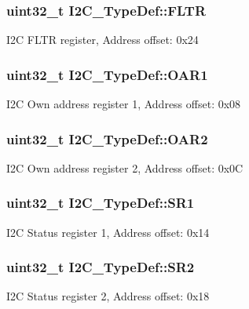 \subsubsection[{\texorpdfstring{F\+L\+TR}{FLTR}}]{ uint32\+\_\+t I2\+C\+\_\+\+Type\+Def\+::\+F\+L\+TR}\hypertarget{struct_i2_c___type_def_a6b540b18ea0370e3e45f69902343320c}{}\label{struct_i2_c___type_def_a6b540b18ea0370e3e45f69902343320c}
I2C F\+L\+TR register, Address offset\+: 0x24 
\subsubsection[{\texorpdfstring{O\+A\+R1}{OAR1}}]{ uint32\+\_\+t I2\+C\+\_\+\+Type\+Def\+::\+O\+A\+R1}\hypertarget{struct_i2_c___type_def_ae8269169fcbdc2ecb580208d99c2f89f}{}\label{struct_i2_c___type_def_ae8269169fcbdc2ecb580208d99c2f89f}
I2C Own address register 1, Address offset\+: 0x08 
\subsubsection[{\texorpdfstring{O\+A\+R2}{OAR2}}]{ uint32\+\_\+t I2\+C\+\_\+\+Type\+Def\+::\+O\+A\+R2}\hypertarget{struct_i2_c___type_def_a73988a218be320999c74a641b3d6e3c1}{}\label{struct_i2_c___type_def_a73988a218be320999c74a641b3d6e3c1}
I2C Own address register 2, Address offset\+: 0x0C 
\subsubsection[{\texorpdfstring{S\+R1}{SR1}}]{ uint32\+\_\+t I2\+C\+\_\+\+Type\+Def\+::\+S\+R1}\hypertarget{struct_i2_c___type_def_a639be124227c03bb3f5fe0e7faf84995}{}\label{struct_i2_c___type_def_a639be124227c03bb3f5fe0e7faf84995}
I2C Status register 1, Address offset\+: 0x14 
\subsubsection[{\texorpdfstring{S\+R2}{SR2}}]{ uint32\+\_\+t I2\+C\+\_\+\+Type\+Def\+::\+S\+R2}\hypertarget{struct_i2_c___type_def_ac509048af4b9ac67c808d584fdbc712e}{}\label{struct_i2_c___type_def_ac509048af4b9ac67c808d584fdbc712e}
I2C Status register 2, Address offset\+: 0x18 
